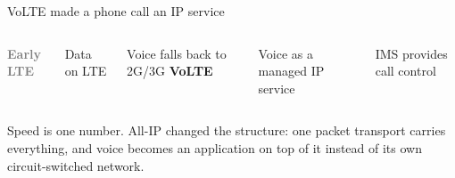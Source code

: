 \begin{frame}{VoLTE made a phone call an IP service}
  \vspace{0.4em}
  \begin{columns}[T,onlytextwidth]
      \centering
      \Huge\textcolor{gray}{\textbf{Early LTE}}

      \vspace{0.8em}
      \large Data on LTE\par
      \vspace{0.3em}
      Voice falls back to 2G/3G
      \centering
      \Huge\textcolor{ranblue}{\textbf{VoLTE}}

      \vspace{0.8em}
      \large Voice as a managed IP service\par
      \vspace{0.3em}
      IMS provides call control
  \end{columns}


  \vspace{1.0em}
     {Speed is one number. All-IP changed the structure: one packet transport
      carries everything, and voice becomes an application on top of it instead
      of its own circuit-switched network.}
\end{frame}


